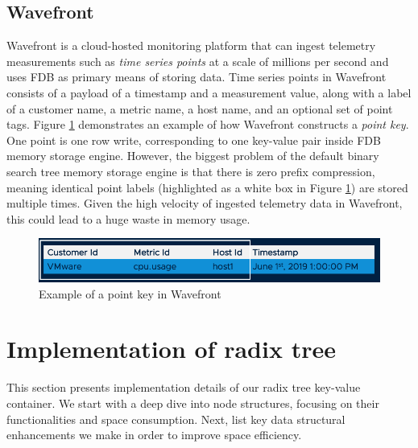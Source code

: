 \documentclass[sigplan,screen,nonacm]{acmart}
\begin{document}
\subsection{Wavefront}
Wavefront \cite{wavefront} is a cloud-hosted monitoring platform that can ingest telemetry measurements such as {\itshape time series points} at a scale of millions per second and uses FDB as primary means of storing data. Time series points in Wavefront consists of a payload of a timestamp and a measurement value, along with a label of a customer name, a metric name, a host name, and an optional set of point tags. Figure \ref{fig:point-key} demonstrates an example of how Wavefront constructs a {\itshape point key}. One point is one row write, corresponding to one key-value pair inside FDB memory storage engine. However, the biggest problem of the default binary search tree memory storage engine is that there is zero prefix compression, meaning identical point labels (highlighted as a white box in Figure \ref{fig:point-key}) are stored multiple times. Given the high velocity of ingested telemetry data in Wavefront, this could lead to a huge waste in memory usage. 
\begin{figure}[h]
  \centering
  \includegraphics[width=\linewidth]{pic/point key.png}
  \setlength{\abovecaptionskip}{-10pt} 
  \setlength{\belowcaptionskip}{-7pt} 
  \caption{Example of a point key in Wavefront}
  \label{fig:point-key}
\end{figure}

\section{Implementation of radix tree}
This section presents implementation details of our radix tree key-value container. We start with a deep dive into node structures, focusing on their functionalities and space consumption. Next, list key data structural enhancements we make in order to improve space efficiency.
\end{document}
